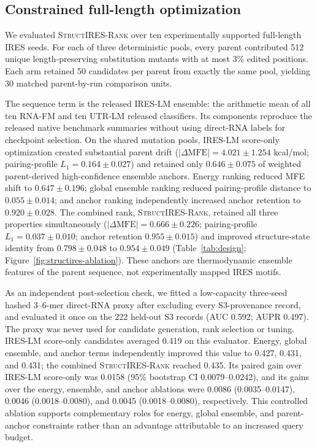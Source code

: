 

\subsection{Constrained full-length optimization}
We evaluated \textsc{StructIRES-Rank} over ten experimentally supported full-length IRES seeds.
For each of three deterministic pools, every parent contributed 512 unique length-preserving
substitution mutants with at most 3\% edited positions. Each arm retained 50 candidates per
parent from exactly the same pool, yielding 30 matched parent-by-run comparison units.

The sequence term is the released IRES-LM ensemble: the arithmetic mean of all ten RNA-FM and ten
UTR-LM released classifiers.  Its components reproduce the released native benchmark summaries
without using direct-RNA labels for checkpoint selection. On the shared mutation pools, IRES-LM
score-only optimization created substantial parent drift ($|\Delta\mathrm{MFE}|=4.021\pm1.254$
kcal/mol; pairing-profile $L_1=0.164\pm0.027$) and retained only $0.646\pm0.075$ of weighted
parent-derived high-confidence ensemble anchors. Energy ranking reduced MFE shift to
$0.647\pm0.196$; global ensemble ranking reduced pairing-profile distance to $0.055\pm0.014$;
and anchor ranking independently increased anchor retention to $0.920\pm0.028$. The combined
rank, \textsc{StructIRES-Rank}, retained all three properties simultaneously
($|\Delta\mathrm{MFE}|=0.666\pm0.226$; pairing-profile $L_1=0.037\pm0.010$; anchor retention
$0.955\pm0.015$) and improved structure-state identity from $0.798\pm0.048$ to
$0.954\pm0.049$ (Table~\ref{tab:design}; Figure~\ref{fig:structires-ablation}). These anchors
are thermodynamic ensemble features of the parent sequence, not experimentally mapped IRES motifs.

As an independent post-selection check, we fitted a low-capacity three-seed hashed 3--6-mer
direct-RNA proxy after excluding every S3-provenance record, and evaluated it once on the 222
held-out S3 records (AUC 0.592; AUPR 0.497). The proxy was never used for candidate generation,
rank selection or tuning. IRES-LM score-only candidates averaged 0.419 on this evaluator. Energy,
global ensemble, and anchor terms independently improved this value to 0.427, 0.431, and 0.431;
the combined \textsc{StructIRES-Rank} reached 0.435. Its paired gain over IRES-LM score-only was
0.0158 (95\% bootstrap CI 0.0079--0.0242), and its gains over the energy, ensemble, and anchor
ablations were 0.0086 (0.0035--0.0147), 0.0046 (0.0018--0.0080), and 0.0045
(0.0018--0.0080), respectively. This controlled ablation supports complementary roles for energy,
global ensemble, and parent-anchor constraints rather than an advantage attributable to an
increased query budget.

